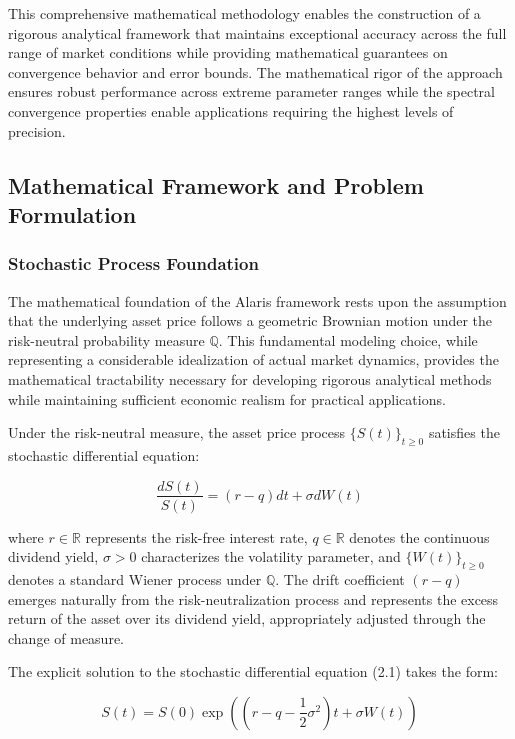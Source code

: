 \documentclass[
  11pt,
  11pt,
  letterpaper,
  onecolumn]{article}
\begin{document}
This comprehensive mathematical methodology enables the construction of
a rigorous analytical framework that maintains exceptional accuracy
across the full range of market conditions while providing mathematical
guarantees on convergence behavior and error bounds. The mathematical
rigor of the approach ensures robust performance across extreme
parameter ranges while the spectral convergence properties enable
applications requiring the highest levels of precision.

\subsection{Mathematical Framework and Problem
Formulation}\label{mathematical-framework-and-problem-formulation}

\subsubsection{Stochastic Process
Foundation}\label{stochastic-process-foundation}

The mathematical foundation of the Alaris framework rests upon the
assumption that the underlying asset price follows a geometric Brownian
motion under the risk-neutral probability measure \(\mathbb{Q}\). This
fundamental modeling choice, while representing a considerable
idealization of actual market dynamics, provides the mathematical
tractability necessary for developing rigorous analytical methods while
maintaining sufficient economic realism for practical applications.

Under the risk-neutral measure, the asset price process
\(\{S(t)\}_{t \geq 0}\) satisfies the stochastic differential equation:

\[\frac{dS(t)}{S(t)} = (r-q)dt + \sigma dW(t) \tag{2.1}\]

where \(r \in \mathbb{R}\) represents the risk-free interest rate,
\(q \in \mathbb{R}\) denotes the continuous dividend yield,
\(\sigma > 0\) characterizes the volatility parameter, and
\(\{W(t)\}_{t \geq 0}\) denotes a standard Wiener process under
\(\mathbb{Q}\). The drift coefficient \((r-q)\) emerges naturally from
the risk-neutralization process and represents the excess return of the
asset over its dividend yield, appropriately adjusted through the change
of measure.

The explicit solution to the stochastic differential equation (2.1)
takes the form:

\[S(t) = S(0) \exp\left(\left(r-q-\frac{1}{2}\sigma^2\right)t + \sigma W(t)\right) \tag{2.2}\]
\end{document}
